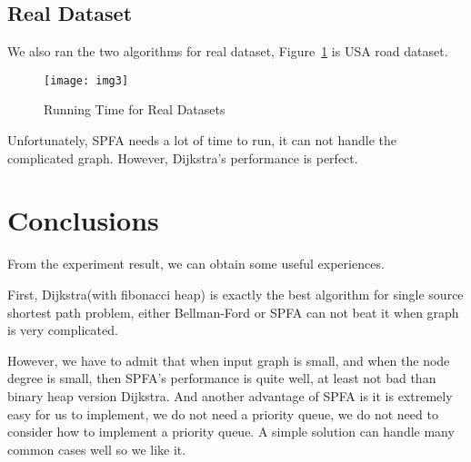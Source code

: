 \documentclass[a4paper, margin=15in]{article}
\begin{document}
\subsection{Real Dataset}

We also ran the two algorithms for real dataset, Figure~\ref{fig:real} is USA road dataset.

\begin{figure}[h]
\centering
     \texttt{[image: img3]}
      \caption{Running Time for Real Datasets}
       \label{fig:real}
\end{figure}

Unfortunately, SPFA needs a lot of time to run, it can not handle the complicated graph.
However, Dijkstra's performance is perfect.

\section{Conclusions}

From the experiment result, we can obtain some useful experiences.

First, Dijkstra(with fibonacci heap) is exactly the best algorithm for single source shortest path problem,
either Bellman-Ford or SPFA can not beat it when graph is very complicated.

However, we have to admit that when input graph is small, and when the node degree is small,
then SPFA's performance is quite well, at least not bad than binary heap version Dijkstra.
And another advantage of SPFA is it is extremely easy for us to implement,
we do not need a priority queue, we do not need to consider how to implement a priority queue.
A simple solution can handle many common cases well so we like it.

\newpage


\end{document}
